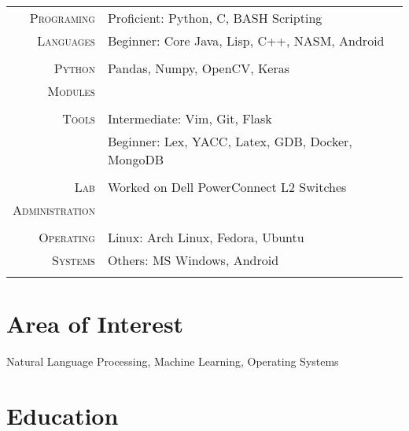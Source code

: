 \documentclass[a4paper,10pt]{article} %
\begin{document}
\begin{tabular}{r|p{11cm}}
        \textsc{Programing} & \textsf{Proficient: Python, C, BASH Scripting} \\
        \textsc{Languages}  & \textsf{Beginner: Core Java, Lisp, C++, NASM, Android} \\
        \multicolumn{2}{c}{} \\

        \textsc{Python} & \textsf{Pandas, Numpy, OpenCV, Keras} \\
        \textsc{Modules}  & \textsf{} \\
        \multicolumn{2}{c}{} \\

        \textsc{Tools} & \textsf{Intermediate: Vim, Git, Flask} \\
                       & \textsf{Beginner: Lex, YACC, Latex, GDB, Docker, MongoDB} \\ 
        \multicolumn{2}{c}{} \\

        \textsc{Lab}            & \textsf{Worked on Dell PowerConnect L2 Switches} \\
        \textsc{Administration} & \\
        \multicolumn{2}{c}{} \\

        \textsc{Operating} & \textsf{Linux: Arch Linux, Fedora, Ubuntu} \\
        \textsc{Systems}   & \textsf{Others: MS Windows, Android} \\
        \multicolumn{2}{c}{} \\
\end{tabular}

\section{Area of Interest}
    \textsf{Natural Language Processing, Machine Learning, Operating Systems}


\section{Education}
\end{document}
